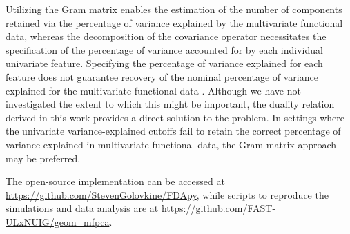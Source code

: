 Utilizing the Gram matrix enables the estimation of the number of components retained via the percentage of variance explained by the multivariate functional data, whereas the decomposition of the covariance operator necessitates the specification of the percentage of variance accounted for by each individual univariate feature. Specifying the percentage of variance explained for each feature does not guarantee recovery of the nominal percentage of variance explained for the multivariate functional data \citep{golovkineEstimationNumberComponents2023}. Although we have not investigated the extent to which this might be important, the duality relation derived in this work provides a direct solution to the problem. In settings where the univariate variance-explained cutoffs fail to retain the correct percentage of variance explained in multivariate functional data, the Gram matrix approach may be preferred.

The open-source implementation can be accessed at \url{https://github.com/StevenGolovkine/FDApy}, while scripts to reproduce the simulations and data analysis are at \url{https://github.com/FAST-ULxNUIG/geom_mfpca}.


